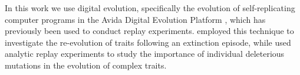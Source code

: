 

In this work we use digital evolution, specifically the evolution of self-replicating computer programs in the Avida Digital Evolution Platform \citep{ofriaAvidaSoftwarePlatform2004a}, which has previously been used to conduct replay experiments.
\citet{yedidHistoricalContingentFactors2008} employed this technique to investigate the re-evolution of traits following an extinction episode, while  
\citet{covertiiiExperimentsRoleDeleterious2013} used analytic replay experiments to study the importance of individual deleterious mutations in the evolution of complex traits.

